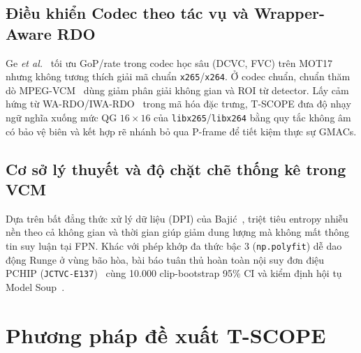 \documentclass[journal]{IEEEtran}
\begin{document}
\subsection{Điều khiển Codec theo tác vụ và Wrapper-Aware RDO}
Ge \textit{et al.}~\cite{ge2024taskaware} tối ưu GoP/rate trong codec học sâu (DCVC, FVC) trên MOT17 nhưng không tương thích giải mã chuẩn \texttt{x265}/\texttt{x264}. Ở codec chuẩn, chuẩn thăm dò MPEG-VCM~\cite{duan2020vcm, gao2021vcm} dùng giảm phân giải không gian và ROI từ detector. Lấy cảm hứng từ WA-RDO/IWA-RDO~\cite{fernandez2026wardo} trong mã hóa đặc trưng, T-SCOPE đưa độ nhạy ngữ nghĩa xuống mức QG $16\times 16$ của \texttt{libx265}/\texttt{libx264} bằng quy tắc không âm có bảo vệ biên và kết hợp rẽ nhánh bỏ qua P-frame để tiết kiệm thực sự \tscopeIwaAnalyticalGmacSaving{} GMACs.

\subsection{Cơ sở lý thuyết và độ chặt chẽ thống kê trong VCM}
Dựa trên bất đẳng thức xử lý dữ liệu (DPI) của Baji\'{c}~\cite{bajic2025rate}, triệt tiêu entropy nhiễu nền theo cả không gian và thời gian giúp giảm dung lượng mà không mất thông tin suy luận tại FPN. Khác với phép khớp đa thức bậc 3 (\texttt{np.polyfit}) dễ dao động Runge ở vùng bão hòa, bài báo tuân thủ hoàn toàn nội suy đơn điệu PCHIP (\texttt{JCTVC-E137})~\cite{jctvc2011e137, fritsch1980monotone} cùng 10.000 clip-bootstrap 95\% CI và kiểm định hội tụ Model Soup~\cite{wortsman2022modelsoups}.

\section{Phương pháp đề xuất T-SCOPE}
\label{sec:method}
\end{document}
